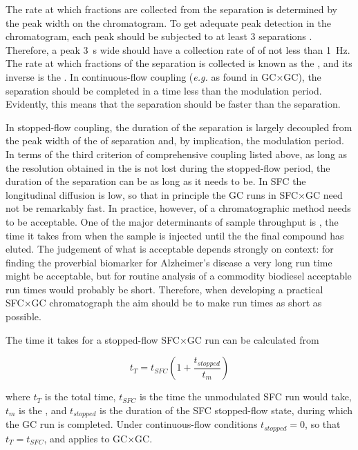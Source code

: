 The rate at which fractions are collected from the \oneD separation is
determined by the peak width on the \oneD chromatogram. To get adequate peak
detection in the \oneD chromatogram, each \oneD peak should be subjected to at
least \num{3} \twoD separations \autocite{Murphy1998}. Therefore, a peak
\SI{3}{s} wide should have a collection rate of of not less than \SI{1}{\hertz}.
The rate at which fractions of the \oneD separation is collected is known as the
, and its inverse is the .
In continuous-flow coupling (\textit{e.g.} as found in GC×GC), the \twoD
separation should be completed in a time less than the modulation period.
Evidently, this means that the \twoD separation should be faster than the \oneD
separation.

In stopped-flow coupling, the duration of the \twoD separation is largely
decoupled from the peak width of the of \oneD separation and, by implication,
the \oneD modulation period. In terms of the third criterion of comprehensive
coupling listed above, as long as the resolution obtained in the \oneD is not
lost during the stopped-flow period, the duration of the \twoD separation can be
as long as it needs to be. In SFC the longitudinal diffusion is low, so that in
principle the \twoD GC runs in SFC×GC need not be remarkably fast. In practice,
however,  of a chromatographic method needs to be
acceptable. One of the major determinants of sample throughput is , the time it takes from when the sample is injected until the the final
compound has eluted. The judgement of what is acceptable depends strongly on
context: for finding the proverbial biomarker for Alzheimer's disease a very
long run time might be acceptable, but for routine analysis of a commodity
biodiesel acceptable run times would probably be short. Therefore, when
developing a practical SFC×GC chromatograph the aim should be to make run times
as short as possible. 

The time it takes for a stopped-flow SFC×GC run can be calculated from

\[t_{T} = t_{SFC} ( 1 + \frac{t_{stopped}}{t_{m}} ) \]

where \(t_T\) is the total time, \(t_{SFC}\) is the time the unmodulated SFC run
would take, \(t_m\) is the , and \(t_{stopped}\) is
the duration of the SFC stopped-flow state, during which the GC run is
completed. Under continuous-flow conditions \( t_{stopped}=0 \), so that \(t_{T}
= t_{SFC}\), and applies to GC×GC.

